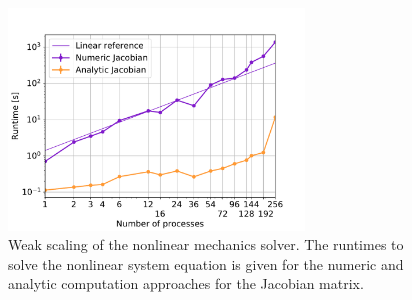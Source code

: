 \begin{figure}
  \centering%
  \includegraphics[width=0.7\textwidth]{images/results/studies/numeric_analytic.pdf}%
  \caption{Weak scaling of the nonlinear mechanics solver. The runtimes to solve the nonlinear system equation is given for the numeric and analytic computation approaches for the Jacobian matrix.}%
  \label{fig:numeric_analytic}%
\end{figure}
